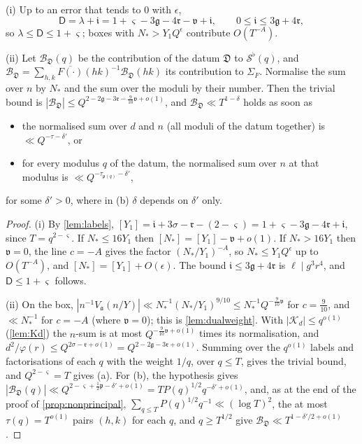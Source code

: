 \documentclass[11pt,colorlinks]{charlie}
\begin{document}
\begin{lemma}\label{lem:degrees}
\textup{(i)} Up to an error that tends to $0$ with $\epsilon$,
\[
 \mathsf D=\lambda+\mathfrak i=1+\varsigma-3\mathfrak g-4\mathfrak r-\mathfrak v+\mathfrak i,\qquad0\le\mathfrak i\le3\mathfrak g+4\mathfrak r,
\]
so $\lambda\le\mathsf D\le1+\varsigma$; boxes with $N_*>Y_1Q^{\epsilon}$ contribute $O(T^{-A})$.

\textup{(ii)} Let $\mathscr B_{\mathfrak D}(q)$ be the contribution of the datum $\mathfrak D$ to $\mathcal S^\flat(q)$, and $\mathscr B_{\mathfrak D}=\sum_{h,k}\overline{F(\cdot)}(hk)^{-1}\mathscr B_{\mathfrak D}(hk)$ its contribution to $\Sigma_F$. Normalise the sum over $n$ by $N_*$ and the sum over the moduli by their number. Then the trivial bound is $|\mathscr B_{\mathfrak D}|\le Q^{2-2\mathfrak g-3\mathfrak r-\frac9{10}\mathfrak v+o(1)}$, and $\mathscr B_{\mathfrak D}\ll T^{1-\delta}$ holds as soon as
\begin{itemize}
\item[(a)] the normalised sum over $d$ and $n$ (all moduli of the datum together) is $\ll Q^{-\tau-\delta'}$, or
\item[(b)] for every modulus $q$ of the datum, the normalised sum over $n$ at that modulus is $\ll Q^{-\tau_{\mathfrak p(q)}-\delta'}$,
\end{itemize}
for some $\delta'>0$, where in (b) $\delta$ depends on $\delta'$ only.
\end{lemma}
\begin{proof}
(i) By \cref{lem:labels}, $[Y_1]=\mathfrak i+3\sigma-\mathfrak r-(2-\varsigma)=1+\varsigma-3\mathfrak g-4\mathfrak r+\mathfrak i$, since $T=q^{2-\varsigma}$. If $N_*\le16Y_1$ then $[N_*]=[Y_1]-\mathfrak v+o(1)$. If $N_*>16Y_1$ then $\mathfrak v=0$, the line $c=-A$ gives the factor $(N_*/Y_1)^{-A}$, so $N_*\le Y_1Q^\epsilon$ up to $O(T^{-A})$, and $[N_*]=[Y_1]+O(\epsilon)$. The bound $\mathfrak i\le3\mathfrak g+4\mathfrak r$ is $\ell\mid g^3r^4$, and $\mathsf D\le1+\varsigma$ follows.

(ii) On the box, $|n^{-1}V_{\mathfrak a}(n/Y)|\ll N_*^{-1}(N_*/Y_1)^{9/10}\le N_*^{-1}Q^{-\frac9{10}\mathfrak v}$ for $c=\frac9{10}$, and $\ll N_*^{-1}$ for $c=-A$ (where $\mathfrak v=0$); this is \cref{lem:dualweight}. With $|\mathscr K_d|\le q^{o(1)}$ (\cref{lem:Kd}) the $n$-sum is at most $Q^{-\frac9{10}\mathfrak v+o(1)}$ times its normalisation, and $d^2/\varphi(r)\le Q^{2\sigma-\mathfrak r+o(1)}=Q^{2-2\mathfrak g-3\mathfrak r+o(1)}$. Summing over the $q^{o(1)}$ labels and factorisations of each $q$ with the weight $1/q$, over $q\le T$, gives the trivial bound, and $Q^{2-\varsigma}=T$ gives (a). For (b), the hypothesis gives $|\mathscr B_{\mathfrak D}(q)|\ll Q^{2-\varsigma+\frac12\mathfrak p-\delta'+o(1)}=TP(q)^{1/2}q^{-\delta'+o(1)}$, and, as at the end of the proof of \cref{prop:nonprincipal}, $\sum_{q\le T}P(q)^{1/2}q^{-1}\ll(\log T)^2$, the at most $\tau(q)=T^{o(1)}$ pairs $(h,k)$ for each $q$, and $q\ge T^{1/2}$ give $\mathscr B_{\mathfrak D}\ll T^{1-\delta'/2+o(1)}$.
\end{proof}
\end{document}
